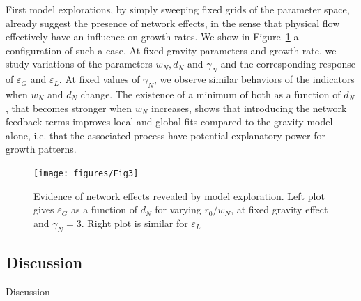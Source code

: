 
First model explorations, by simply sweeping fixed grids of the parameter space, already suggest the presence of network effects, in the sense that physical flow effectively have an influence on growth rates. We show in Figure~\ref{fig:networkeffects} a configuration of such a case. At fixed gravity parameters and growth rate, we study variations of the parameters $w_N, d_N$ and $\gamma_N$ and the corresponding response of $\varepsilon_G$ and $\varepsilon_L$. At fixed values of $\gamma_N$, we observe similar behaviors of the indicators when $w_N$ and $d_N$ change. The existence of a minimum of both as a function of $d_N$, that becomes stronger when $w_N$ increases, shows that introducing the network feedback terms improves local and global fits compared to the gravity model alone, i.e. that the associated process have potential explanatory power for growth patterns.


\begin{figure}
\centering
\texttt{[image: figures/Fig3]}
\caption{Evidence of network effects revealed by model exploration. Left plot gives $\varepsilon_G$ as a function of $d_N$ for varying $r_0/w_N$, at fixed gravity effect and $\gamma_N=3$. Right plot is similar for $\varepsilon_L$}
\label{fig:networkeffects}
\end{figure}



























\subsection{Discussion}{Discussion}

